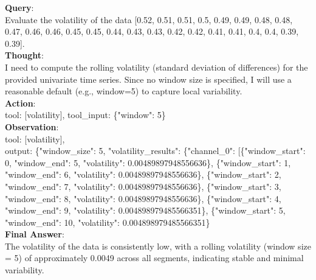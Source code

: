 \clearpage
\begin{tcolorbox}[
  colback=white,
  colframe=black!50,
  boxrule=0.3mm,
  width=\textwidth,
  rounded corners,
  title=Sample 6: Volatility Evaluation,
  fonttitle=\bfseries,
  left=2mm, right=2mm, top=2mm, bottom=2mm
]
\textbf{Query}:\\
Evaluate the volatility of the data [0.52, 0.51, 0.51, 0.5, 0.49, 0.49, 0.48, 0.48, 0.47, 0.46, 0.46, 0.45, 0.45, 0.44, 0.43, 0.43, 0.42, 0.42, 0.41, 0.41, 0.4, 0.4, 0.39, 0.39]. \\

\textbf{Thought}:\\
I need to compute the rolling volatility (standard deviation of differences) for the provided univariate time series. Since no window size is specified, I will use a reasonable default (e.g., window=5) to capture local variability.\\


\textbf{Action}:\\
tool: [volatility], tool\_input: \{"window": 5\} \\

\textbf{Observation}: \\
tool: [volatility], 
\\
output: \{"window\_size": 5, "volatility\_results": \{"channel\_0": [\{"window\_start": 0, "window\_end": 5, "volatility": 0.00489897948556636\}, \{"window\_start": 1, "window\_end": 6, "volatility": 0.00489897948556636\}, \{"window\_start": 2, "window\_end": 7, "volatility": 0.00489897948556636\}, \{"window\_start": 3, "window\_end": 8, "volatility": 0.00489897948556636\}, \{"window\_start": 4, "window\_end": 9, "volatility": 0.004898979485566351\}, \{"window\_start": 5, "window\_end": 10, "volatility": 0.004898979485566351\} \\


\textbf{Final Answer}:\\
The volatility of the data is consistently low, with a rolling volatility (window size = 5) of approximately 0.0049 across all segments, indicating stable and minimal variability.
\end{tcolorbox}





